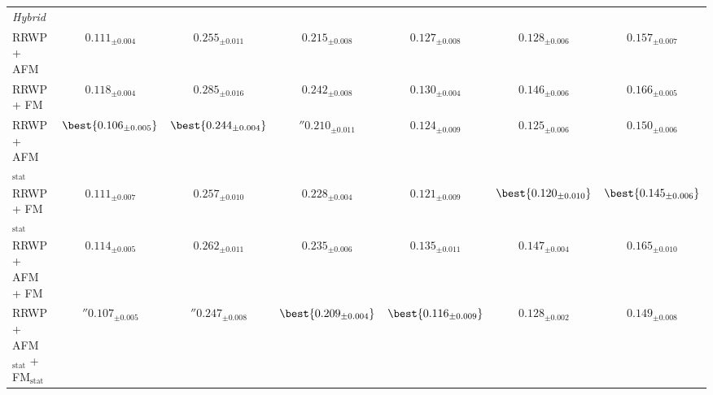\begin{table}
{\begin{tabular}{l c c c c c c}
\midrule
\multicolumn{7}{l}{\textit{Hybrid}} \\
  RRWP + AFM & $0.111{_{\pm 0.004}}$ & $0.255{_{\pm 0.011}}$ & $0.215{_{\pm 0.008}}$ & $0.127{_{\pm 0.008}}$ & $0.128{_{\pm 0.006}}$ & $0.157{_{\pm 0.007}}$ \\
  RRWP + FM & $0.118{_{\pm 0.004}}$ & $0.285{_{\pm 0.016}}$ & $0.242{_{\pm 0.008}}$ & $0.130{_{\pm 0.004}}$ & $0.146{_{\pm 0.006}}$ & $0.166{_{\pm 0.005}}$ \\
  RRWP + AFM$_{\text{stat}}$ & $\best{0.106{_{\pm 0.005}}}$ & $\best{0.244{_{\pm 0.004}}}$ & $\second{0.210}{_{\pm 0.011}}$ & $0.124{_{\pm 0.009}}$ & $0.125{_{\pm 0.006}}$ & $0.150{_{\pm 0.006}}$ \\
  RRWP + FM$_{\text{stat}}$ & $0.111{_{\pm 0.007}}$ & $0.257{_{\pm 0.010}}$ & $0.228{_{\pm 0.004}}$ & $0.121{_{\pm 0.009}}$ & $\best{0.120{_{\pm 0.010}}}$ & $\best{0.145{_{\pm 0.006}}}$ \\
  RRWP + AFM + FM & $0.114{_{\pm 0.005}}$ & $0.262{_{\pm 0.011}}$ & $0.235{_{\pm 0.006}}$ & $0.135{_{\pm 0.011}}$ & $0.147{_{\pm 0.004}}$ & $0.165{_{\pm 0.010}}$ \\
  RRWP + AFM$_{\text{stat}}$ + FM$_{\text{stat}}$ & $\second{0.107}{_{\pm 0.005}}$ & $\second{0.247}{_{\pm 0.008}}$ & $\best{0.209{_{\pm 0.004}}}$ & $\best{0.116{_{\pm 0.009}}}$ & $0.128{_{\pm 0.002}}$ & $0.149{_{\pm 0.008}}$ \\
\bottomrule
\end{tabular}
}
\end{table}

